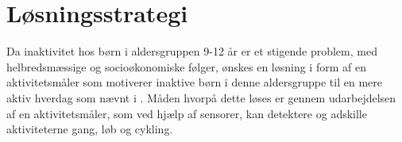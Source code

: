 \section{Løsningsstrategi}


%

%

Da inaktivitet hos børn i aldersgruppen 9-12 år er et stigende problem, med helbredsmæssige og socioøkonomiske følger, ønskes en løsning i form af en aktivitetsmåler som motiverer inaktive børn i denne aldersgruppe til en mere aktiv hverdag som nævnt i . 
Måden hvorpå dette løses er gennem udarbejdelsen af en aktivitetsmåler, som ved hjælp af sensorer, kan detektere og adskille aktiviteterne gang, løb og cykling.  
 


